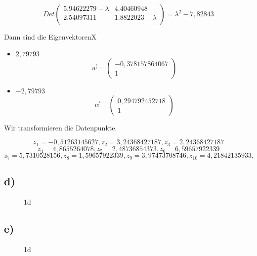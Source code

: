 \documentclass[a4paper,parskip=full-]{article}
\begin{document}
$$
Det\left(
\begin{array}{cc}
 5.94622279 - \lambda & 4.40460948 \\
 2.54097311           & 1.8822023 - \lambda \\
\end{array}
\right) = \lambda^2-7,82843
$$

Dann sind die EigenvektorenX

\begin{itemize}
\item $2,79793$
$$
\vec{w} = 
\begin{pmatrix} -0,378157864067 \\ 1 \end{pmatrix}
$$
\item $-2,79793$
$$
\vec{w} = 
\begin{pmatrix} 0,294792452718 \\ 1 \end{pmatrix}
$$
\end{itemize}

Wir transformieren die Datenpunkte.

$$
z_1
 = 
-0,51263145627, 
z_2
 = 
3,24368427187,
z_3 
 = 
2,24368427187 
$$
$$
z_4
 = 
4,8655264078,
z_5
 = 
2,48736854373,
z_6
 = 
6,59657922339 $$ $$
z_7
 = 
5,7310528156,
z_8
 = 
1,59657922339,
z_9
 = 
3,97473708746,
z_{10}
 = 
4,21842135933,
$$

\subsection{d)}

\begin{figure}[H]
    \def\svgwidth{\columnwidth}
	
	\label{fig:1d}
	\caption{1d}
\end{figure}

\subsection{e)}

\begin{figure}[H]
    \def\svgwidth{\columnwidth}
	
	\label{fig:1e}
	\caption{1d}
\end{figure}
\end{document}
